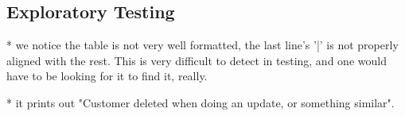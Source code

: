 \subsection{Exploratory Testing}

* we notice the table is not very well formatted, the last line's '|' is not properly aligned with the rest. This is very difficult to detect in testing, and one would have to be looking for it to find it, really. 

* it prints out "Customer deleted when doing an update, or something similar". 